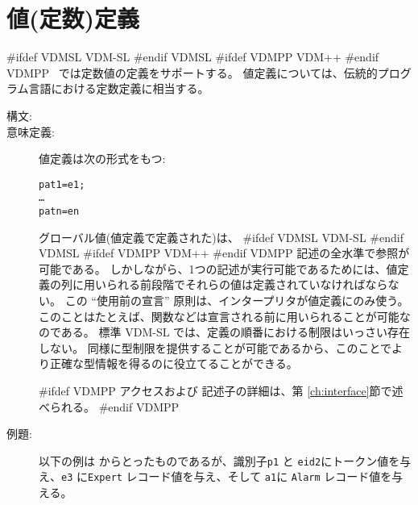 \documentclass[\pformat,12pt]{jarticle}
\newcommand{\vdmslpp}[2]{%
#ifdef VDMSL
#1
#endif VDMSL
#ifdef VDMPP
#2
#endif VDMPP
}
\newcommand{\vdmsl}{VDM-SL}
\newcommand{\vdmpp}{VDM++}
\begin{document}
\section{値(定数)定義} \label{valuedef}

\vdmslpp{\vdmsl}{\vdmpp}\ では定数値の定義をサポートする。 
値定義については、伝統的プログラム言語における定数定義に相当する。

\begin{description}
\item[構文:]




\item[意味定義:] 値定義は次の形式をもつ:
  \begin{alltt}
       pat1 = e1;
      \ldots
       patn = en
  \end{alltt}

  
グローバル値(値定義で定義された)は、 \vdmslpp{\vdmsl}{\vdmpp} 記述の全水準で参照が可能である。
しかしながら、1つの記述が実行可能であるためには、値定義の列に用いられる前段階でそれらの値は定義されていなければならない。 
この ``使用前の宣言'' 原則は、インタープリタが値定義にのみ使う。
 このことはたとえば、関数などは宣言される前に用いられることが可能なのである。
標準 VDM-SL では、定義の順番における制限はいっさい存在しない。
同様に型制限を提供することが可能であるから、このことでより正確な型情報を得るのに役立てることができる。

#ifdef VDMPP
アクセスおよび  記述子の詳細は、第 \ref{ch:interface}節で述べられる。 
#endif VDMPP

\item[例題:] 以下の例は \cite{Fitzgerald&98} からとったものであるが、識別子\texttt{p1} と \texttt{eid2}にトークン値を与え、\texttt{e3} に\texttt{Expert} レコード値を与え、そして \texttt{a1}に \texttt{Alarm} レコード値を与える。
\begin{alltt}


\end{alltt}
\end{description}
\end{document}
